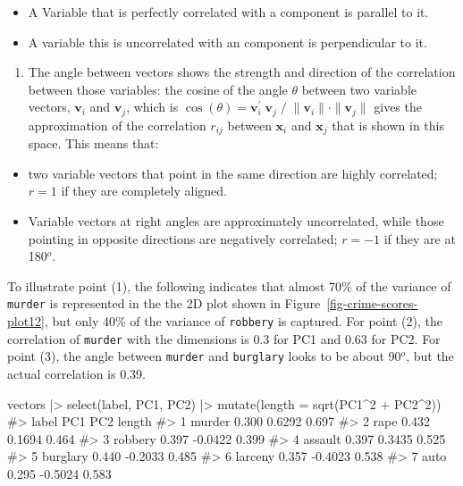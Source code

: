\documentclass[
  letterpaper,
  10pt,
  krantz2]{krantz}
\makeatletter
\newenvironment{Shaded}{\begin{snugshade}}{\end{snugshade}}
\newcommand{\AttributeTok}[1]{\textcolor[rgb]{0.40,0.45,0.13}{#1}}
\newcommand{\CommentTok}[1]{\textcolor[rgb]{0.37,0.37,0.37}{#1}}
\newcommand{\DecValTok}[1]{\textcolor[rgb]{0.68,0.00,0.00}{#1}}
\newcommand{\FunctionTok}[1]{\textcolor[rgb]{0.28,0.35,0.67}{#1}}
\newcommand{\NormalTok}[1]{\textcolor[rgb]{0.00,0.23,0.31}{#1}}
\newcommand{\SpecialCharTok}[1]{\textcolor[rgb]{0.37,0.37,0.37}{#1}}
\providecommand{\tightlist}{%
  \setlength{\itemsep}{0pt}\setlength{\parskip}{0pt}}\usepackage{longtable,booktabs,array}
\newenvironment{kframe}{%
  \medskip{}
  \setlength{\fboxsep}{.8em}
  \def\at@end@of@kframe{}%
  \ifinner\ifhmode%
  \def\at@end@of@kframe{\end{minipage}}%
  \begin{minipage}{\columnwidth}%
  \fi\fi%
  \def\FrameCommand##1{\hskip\@totalleftmargin \hskip-\fboxsep
  \colorbox{shadecolor}{##1}\hskip-\fboxsep
      \hskip-\linewidth \hskip-\@totalleftmargin \hskip\columnwidth}%
  \MakeFramed {\advance\hsize-\width
    \@totalleftmargin\z@ \linewidth\hsize
    \@setminipage}}%
{\par\unskip\endMakeFramed%
  \at@end@of@kframe}
\renewenvironment{Shaded}{\begin{kframe}}{\end{kframe}}
\makeatother
\begin{document}
\begin{itemize}
\tightlist
\item
  A Variable that is perfectly correlated with a component is parallel
  to it.
\item
  A variable this is uncorrelated with an component is perpendicular to
  it.
\end{itemize}

\begin{enumerate}
\def\labelenumi{(\arabic{enumi})}
\setcounter{enumi}{2}
\tightlist
\item
  The angle between vectors shows the strength and direction of the
  correlation between those variables: the cosine of the angle
  \(\theta\) between two variable vectors, \(\mathbf{v}_i\) and
  \(\mathbf{v}_j\), which is
  \(\cos(\theta) = \mathbf{v}_i^\prime \; \mathbf{v}_j \;/ \; \| \mathbf{v}_i \| \cdot \| \mathbf{v}_j \|\)
  gives the approximation of the correlation \(r_{ij}\) between
  \(\mathbf{x}_i\) and \(\mathbf{x}_j\) that is shown in this space.
  This means that:
\end{enumerate}

\begin{itemize}
\tightlist
\item
  two variable vectors that point in the same direction are highly
  correlated; \(r = 1\) if they are completely aligned.
\item
  Variable vectors at right angles are approximately uncorrelated, while
  those pointing in opposite directions are negatively correlated;
  \(r = -1\) if they are at 180\(^o\).
\end{itemize}

To illustrate point (1), the following indicates that almost 70\% of the
variance of \texttt{murder} is represented in the the 2D plot shown in
Figure~\ref{fig-crime-scores-plot12}, but only 40\% of the variance of
\texttt{robbery} is captured. For point (2), the correlation of
\texttt{murder} with the dimensions is 0.3 for PC1 and 0.63 for PC2. For
point (3), the angle between \texttt{murder} and \texttt{burglary} looks
to be about 90\(^o\), but the actual correlation is 0.39.

\begin{Shaded}
\begin{Highlighting}[]
\NormalTok{vectors }\SpecialCharTok{|\textgreater{}} \FunctionTok{select}\NormalTok{(label, PC1, PC2) }\SpecialCharTok{|\textgreater{}} 
  \FunctionTok{mutate}\NormalTok{(}\AttributeTok{length =} \FunctionTok{sqrt}\NormalTok{(PC1}\SpecialCharTok{\^{}}\DecValTok{2} \SpecialCharTok{+}\NormalTok{ PC2}\SpecialCharTok{\^{}}\DecValTok{2}\NormalTok{))}
\CommentTok{\#\textgreater{}      label   PC1     PC2 length}
\CommentTok{\#\textgreater{} 1   murder 0.300  0.6292  0.697}
\CommentTok{\#\textgreater{} 2     rape 0.432  0.1694  0.464}
\CommentTok{\#\textgreater{} 3  robbery 0.397 {-}0.0422  0.399}
\CommentTok{\#\textgreater{} 4  assault 0.397  0.3435  0.525}
\CommentTok{\#\textgreater{} 5 burglary 0.440 {-}0.2033  0.485}
\CommentTok{\#\textgreater{} 6  larceny 0.357 {-}0.4023  0.538}
\CommentTok{\#\textgreater{} 7     auto 0.295 {-}0.5024  0.583}
\end{Highlighting}
\end{Shaded}
\end{document}
